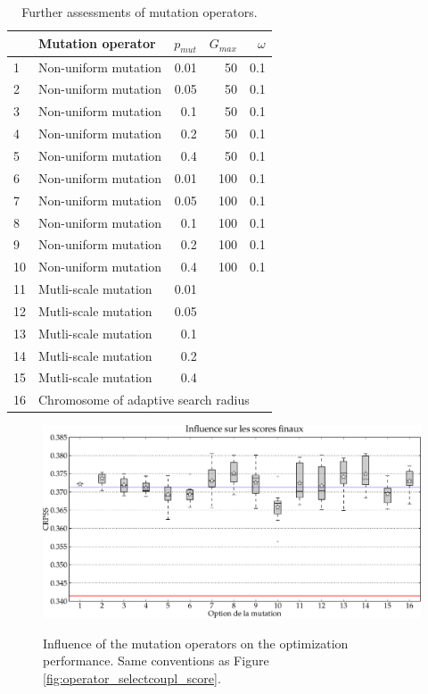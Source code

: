 \documentclass[twocol]{ametsoc}
\begin{document}
\begin{table}[htbp]
	\caption{Further assessments of mutation operators.}
	\begin{center}
		\begin{tabular}{llrrr}
			\hline\hline  & \textbf{Mutation operator} & \textbf{$p_{mut}$} & \textbf{$G_{max}$} & \textbf{$\omega$}\\ 
			\hline 1 & Non-uniform mutation & 0.01 & 50 & 0.1 \\
			2 & Non-uniform mutation & 0.05 & 50 & 0.1 \\
			3 & Non-uniform mutation & 0.1 & 50 & 0.1 \\
			4 & Non-uniform mutation & 0.2 & 50 & 0.1 \\
			5 & Non-uniform mutation & 0.4 & 50 & 0.1 \\
			6 & Non-uniform mutation & 0.01 & 100 & 0.1 \\
			7 & Non-uniform mutation & 0.05 & 100 & 0.1 \\
			8 & Non-uniform mutation & 0.1 & 100 & 0.1 \\
			9 & Non-uniform mutation & 0.2 & 100 & 0.1 \\
			10 & Non-uniform mutation & 0.4 & 100 & 0.1 \\
			11 & Mutli-scale mutation &  0.01 &&\\
			12 & Mutli-scale mutation &  0.05 && \\
			13 & Mutli-scale mutation &  0.1 && \\
			14 & Mutli-scale mutation &  0.2 && \\
			15 & Mutli-scale mutation &  0.4 && \\
			16 & \multicolumn{4}{l}{Chromosome of adaptive search radius} \\
			\hline
		\end{tabular}
	\end{center}
	\label{tab:assessed_mutation_operators_bis}
\end{table}


\begin{figure}[htb]
	\begin{center}
		\noindent\includegraphics[width=14cm,angle=0]{figures/operator_mutation_score_atmlevel.pdf}\\
	\end{center}
	\caption{Influence of the mutation operators on the optimization performance. Same conventions as Figure \ref{fig:operator_selectcoupl_score}.}
	\label{fig:operator_mutation_score_atmlevel}
\end{figure}
\end{document}
